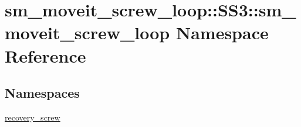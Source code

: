 \hypertarget{namespacesm__moveit__screw__loop_1_1SS3_1_1sm__moveit__screw__loop}{}\section{sm\+\_\+moveit\+\_\+screw\+\_\+loop\+:\+:S\+S3\+:\+:sm\+\_\+moveit\+\_\+screw\+\_\+loop Namespace Reference}
\label{namespacesm__moveit__screw__loop_1_1SS3_1_1sm__moveit__screw__loop}
\subsection*{Namespaces}
\begin{DoxyCompactItemize}
\item 
 \hyperlink{namespacesm__moveit__screw__loop_1_1SS3_1_1sm__moveit__screw__loop_1_1recovery__screw}{recovery\+\_\+screw}
\end{DoxyCompactItemize}
